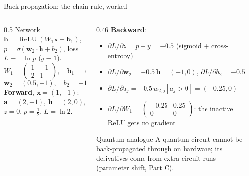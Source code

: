 \documentclass[aspectratio=169,11pt]{beamer}
\newcommand{\key}[1]{{\color{qdark}\textbf{#1}}}
\newcommand{\bx}{\mathbf x}
\begin{document}
\begin{frame}[label=fBackprop]{Back-propagation: the chain rule, worked}
  \begin{columns}[T]
    \begin{column}{0.5\textwidth}
      \small
      Network: $\mathbf h = \operatorname{ReLU}(W_1\bx + \mathbf b_1)$, $p = \sigma(\mathbf w_2\cdot\mathbf h + b_2)$, loss $L = -\ln p$ ($y = 1$).
      \[ W_1 = \begin{pmatrix}1 & -1\\ 2 & 1\end{pmatrix},\quad \mathbf b_1 = (0, -2), \]\[ \mathbf w_2 = (0.5, -1),\quad b_2 = -1. \]
      \key{Forward}, $\bx = (1, -1)$: $\mathbf a = (2, -1)$, $\mathbf h = (2, 0)$, $z = 0$, $p = \frac12$, $L = \ln2$.
    \end{column}
    \begin{column}{0.46\textwidth}
      \small
      \key{Backward}:
      \begin{itemize}\itemsep1pt
        \item $\partial L/\partial z = p - y = -0.5$ (sigmoid + cross-entropy)
        \item $\partial L/\partial\mathbf w_2 = -0.5\,\mathbf h = (-1, 0)$, $\partial L/\partial b_2 = -0.5$
        \item $\partial L/\partial a_j = -0.5\,w_{2,j}[a_j > 0] = (-0.25, 0)$
        \item $\partial L/\partial W_1 = \begin{pmatrix}-0.25 & 0.25\\ 0 & 0\end{pmatrix}$: the inactive ReLU gets no gradient
      \end{itemize}
      \begin{block}{Quantum analogue}
        \scriptsize A quantum circuit cannot be back-propagated through on hardware; its derivatives come from extra circuit runs
        (parameter shift, Part C).
      \end{block}
    \end{column}
  \end{columns}
\end{frame}
\end{document}
